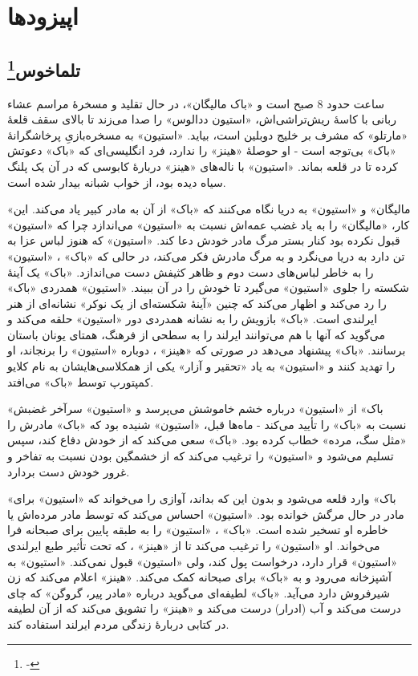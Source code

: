 \documentclass[12pt]{book}
\newcommand{\noun}[1]{«{#1}»}
\begin{document}
    \part{اپیزودها}
    \chapter[تلماخوس]{تلماخوس\protect\footnote{-}}\label{ep:1}
    ساعت حدود 8 صبح است و \noun{باک مالیگان‬}، در حال تقلید و مسخرۀ مراسم عشاء ربانی با کاسۀ ریش‌تراشی‌اش، \noun{استیون ددالوس} را صدا می‌زند تا بالای سقف قلعۀ \noun{مارتلو} که مشرف بر خلیج دوبلین است، بیاید.  \noun{استیون} به مسخره‌بازیِ پرخاشگرانۀ \noun{باک}  بی‌توجه است - او حوصلۀ \noun{هینز}  را ندارد، فرد انگلیسی‌ای که \noun{باک}  دعوتش کرده تا در قلعه بماند. \noun{استیون} با ناله‌های \noun{هینز}  دربارۀ کابوسی که در آن یک پلنگ سیاه دیده بود، از خواب شبانه بیدار شده است.

    \noun{مالیگان} و \noun{استیون} به دریا نگاه می‌کنند که \noun{باک}  از آن به مادر کبیر یاد می‌کند. این کار، \noun{مالیگان} را به یاد غضب عمه‌اش نسبت به \noun{استیون} می‌اندازد چرا که \noun{استیون} قبول نکرده بود کنار بستر مرگ مادر خودش دعا کند. \noun{استیون} که هنوز لباس عزا به تن دارد به دریا می‌نگرد و به مرگ مادرش فکر می‌کند، در حالی که \noun{باک} ، \noun{استیون} را به خاطر لباس‌‌های دست دوم و ظاهر کثیفش دست می‌اندازد. \noun{باک}  یک آینۀ شکسته را جلوی \noun{استیون} می‌گیرد تا خودش را در آن ببیند. \noun{استیون} همدردی \noun{باک}  را رد می‌کند و اظهار می‌کند که چنین «آینۀ شکسته‌ای از یک نوکر» نشانه‌ای از هنر ایرلندی است. \noun{باک}  بازویش را به نشانه همدردی دور \noun{استیون} حلقه می‌کند و می‌گوید که آنها با هم می‌توانند ایرلند را به سطحی از فرهنگ، همتای یونان باستان برسانند. \noun{باک}  پیشنهاد می‌دهد در صورتی که \noun{هینز} ، دوباره \noun{استیون} را برنجاند، او را تهدید کنند و \noun{استیون} به یاد «تحقیر و آزار» یکی از همکلاسی‌هایشان به نام کلایو کمپتورپ توسط \noun{باک}  می‌افتد.

    \noun{باک}  از \noun{استیون} درباره خشم خاموشش می‌پرسد و \noun{استیون} سرآخر غضبش نسبت به \noun{باک}  را تأیید می‌کند - ماه‌ها قبل، \noun{استیون} شنیده بود که \noun{باک}  مادرش را «مثل سگ، مرده» خطاب کرده بود. \noun{باک}  سعی می‌کند که از خودش دفاع کند، سپس تسلیم می‌شود و \noun{استیون} را ترغیب می‌کند که از خشمگین بودن نسبت به تفاخر و غرور خودش دست بردارد.

    \noun{باک}  وارد قلعه می‌شود و بدون این که بداند، آوازی را می‌خواند که \noun{استیون} برای مادر در حال مرگش خوانده بود. \noun{استیون} احساس می‌کند که توسط مادر مرده‌اش یا خاطره او تسخیر شده است. \noun{باک} ، \noun{استیون} را به طبقه پایین برای صبحانه فرا می‌خواند. او \noun{استیون} را ترغیب می‌کند تا از \noun{هینز} ، که تحت تأثیر طبع ایرلندی \noun{استیون} قرار دارد، درخواست پول کند، ولی \noun{استیون} قبول نمی‌کند. \noun{استیون} به آشپزخانه می‌رود و به \noun{باک}  برای صبحانه کمک می‌کند. \noun{هینز}  اعلام می‌کند که زن شیرفروش دارد می‌آید. \noun{باک}  لطیفه‌ای می‌گوید درباره «مادر پیر، گروگن» که چای درست می‌کند و آب (ادرار) درست می‌کند و \noun{هینز}  را تشویق می‌کند که از آن لطیفه در کتابی دربارۀ زندگی مردم ایرلند استفاده کند.
\end{document}
